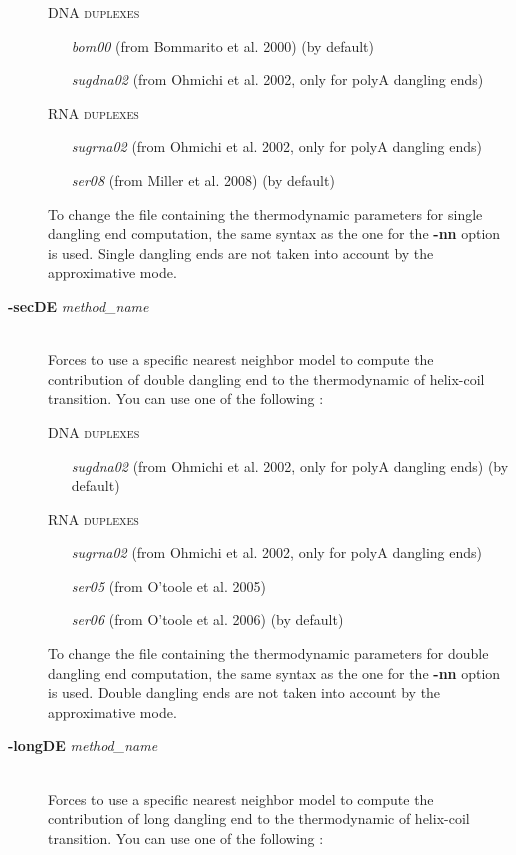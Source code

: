 \documentclass{article}
\begin{document}
\begin{description}
  \textsc{DNA duplexes}
    \begin{itemize}
    \item [\textit{bom00}] (from Bommarito et al. 2000)  (by default) 
    \item [\textit{sugdna02}] (from Ohmichi et al. 2002, only for polyA dangling ends)      
    \end{itemize}
  \textsc{RNA duplexes}
    \begin{itemize}
    \item [\textit{sugrna02}] (from Ohmichi et al. 2002, only for polyA dangling ends)
    \item [\textit{ser08}] (from Miller et al. 2008)  (by default) 		  
    \end{itemize}
  To change the file containing the thermodynamic parameters for single dangling end computation, the same syntax as the one for the \textbf{-nn} option is used.
  Single dangling ends are not taken into account by the approximative mode.   
\item [\textbf{-secDE} \textit{method\_name}]\mbox{}\\ 
  Forces to use a specific nearest neighbor model to compute the contribution of double dangling end to the thermodynamic of helix-coil transition. 
  You can use one of the following :
  
  \textsc{DNA duplexes}
    \begin{itemize}
    \item [\textit{sugdna02}] (from Ohmichi et al. 2002, only for polyA dangling ends) (by default)     
    \end{itemize}
  \textsc{RNA duplexes}
    \begin{itemize}
    \item [\textit{sugrna02}] (from Ohmichi et al. 2002, only for polyA dangling ends)
    \item [\textit{ser05}] (from O'toole et al. 2005) 	
    \item [\textit{ser06}] (from O'toole et al. 2006) (by default) 			 
    \end{itemize}
  To change the file containing the thermodynamic parameters for double dangling end computation, the same syntax as the one for the \textbf{-nn} option is used.
  Double dangling ends are not taken into account by the approximative mode.  
\item [\textbf{-longDE} \textit{method\_name}]\mbox{}\\ 
  Forces to use a specific nearest neighbor model to compute the contribution of long dangling end to the thermodynamic of helix-coil transition. 
  You can use one of the following :
  

\end{description}
\end{document}

